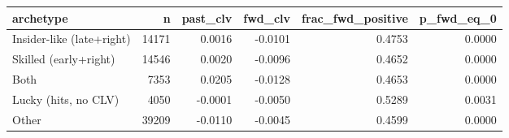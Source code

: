 \begin{tabular}{lrrrrr}
\toprule
archetype & n & past\_clv & fwd\_clv & frac\_fwd\_positive & p\_fwd\_eq\_0 \\
\midrule
Insider-like (late+right) & 14171 & 0.0016 & -0.0101 & 0.4753 & 0.0000 \\
Skilled (early+right) & 14546 & 0.0020 & -0.0096 & 0.4652 & 0.0000 \\
Both & 7353 & 0.0205 & -0.0128 & 0.4653 & 0.0000 \\
Lucky (hits, no CLV) & 4050 & -0.0001 & -0.0050 & 0.5289 & 0.0031 \\
Other & 39209 & -0.0110 & -0.0045 & 0.4599 & 0.0000 \\
\bottomrule
\end{tabular}
